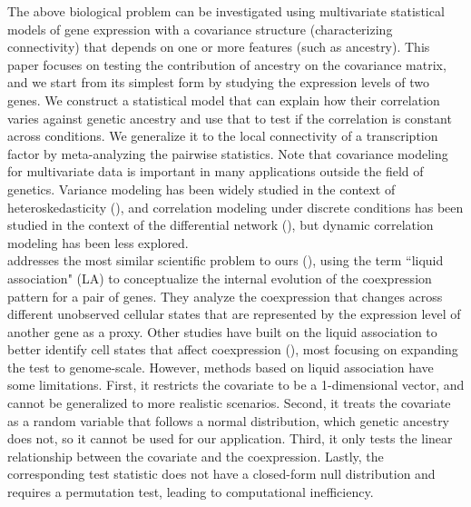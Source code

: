 \documentclass[aap,authoryear, preprint]{imsart}
\numberwithin{equation}{section}
\theoremstyle{plain}
\begin{document}
The above biological problem can be investigated using multivariate statistical models of gene expression with a covariance structure (characterizing connectivity) that depends on one or more features (such as ancestry). This paper focuses on testing the contribution of ancestry on the covariance matrix, and we start from its simplest form by studying the expression levels of two genes. We construct a statistical model that can explain how their correlation varies against genetic ancestry and use that to test if the correlation is constant across conditions. We generalize it to the local connectivity of a transcription factor by meta-analyzing the pairwise statistics. Note that covariance modeling for multivariate data is important in many applications outside the field of genetics. Variance modeling has been widely studied in the context of heteroskedasticity (\cite{breusch1979simple, glejser1969new, white1980heteroskedasticity}), and correlation modeling under discrete conditions has been studied in the context of the differential network (\cite{ideker2012differential}), but dynamic correlation modeling has been less explored. \\

\cite{li2002genome} addresses the most similar scientific problem to ours (\cite{li2002genome, li2004system}), using the term ``liquid association" (LA) to conceptualize the internal evolution of the coexpression pattern for a pair of genes. They analyze the coexpression that changes across different unobserved cellular states that are represented by the expression level of another gene as a proxy. Other studies have built on the liquid association to better identify cell states that affect coexpression (\cite{yan2017detecting, yu2018new}), most focusing on expanding the test to genome-scale. However, methods based on liquid association have some limitations. First, it restricts the covariate to be a 1-dimensional vector, and cannot be generalized to more realistic scenarios. Second, it treats the covariate as a random variable that follows a normal distribution, which genetic ancestry does not, so it cannot be used for our application. Third, it only tests the linear relationship between the covariate and the coexpression. Lastly, the corresponding test statistic does not have a closed-form null distribution and requires a permutation test, leading to computational inefficiency. \\
\end{document}
